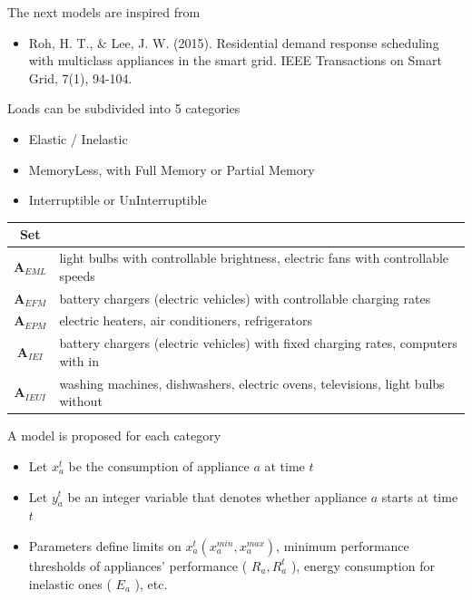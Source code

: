 \begin{frame}{The next models are inspired from}
\begin{itemize}
  \item Roh, H. T., \& Lee, J. W. (2015). Residential demand response scheduling with multiclass appliances in the smart grid. IEEE Transactions on Smart Grid, 7(1), 94-104.
\end{itemize}

\end{frame} \begin{frame}{Loads can be subdivided into 5 categories}
\begin{itemize}
  \item Elastic / Inelastic
  \item MemoryLess, with Full Memory or Partial Memory
  \item Interruptible or UnInterruptible
\end{itemize}

\begin{center}
\begin{tabularx}{\textwidth}{cX}
\hline
Set &  \\
\hline
$\boldsymbol{A}_{E M L}$ & light bulbs with controllable brightness, electric fans with controllable speeds \\

$\boldsymbol{A}_{E F M}$ & battery chargers (electric vehicles) with controllable charging rates \\
$\boldsymbol{A}_{E P M}$ & electric heaters, air conditioners, refrigerators \\
$\boldsymbol{A}_{I E I}$ & battery chargers (electric vehicles) with fixed charging rates, computers with in \\
$\boldsymbol{A}_{I E U I}$ & washing machines, dishwashers, electric ovens, televisions, light bulbs without \\
\hline
\end{tabularx}
\end{center}

\end{frame} \begin{frame}{A model is proposed for each category}
\begin{itemize}
  \item Let $x_{a}^{t}$ be the consumption of appliance $a$ at time $t$
  \item Let $y_{a}^{t}$ be an integer variable that denotes whether appliance $a$ starts at time $t$
  \item Parameters define limits on $x_{a}^{t}\left(x_{a}^{m i n}, x_{a}^{m a x}\right)$, minimum performance thresholds of appliances' performance ( $R_{a}, R_{a}^{t}$ ), energy consumption for inelastic ones ( $E_{a}$ ), etc.
\end{itemize}


\end{frame}
